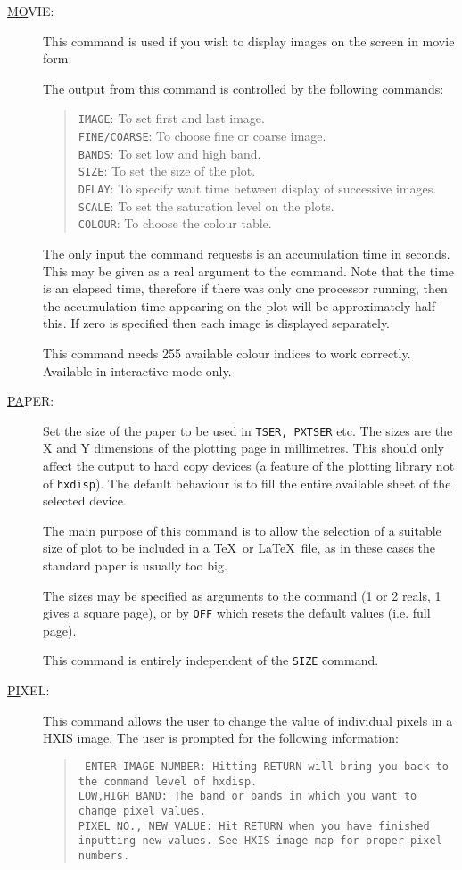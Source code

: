 \begin{description}
\item[\underline{MO}VIE: ] \label{mo}
This command is used if you wish to display images on the screen in
movie form.

The output from this command is controlled by the following commands:
\begin{quote}
{\tt IMAGE}: To set first and last image.\\ {\tt FINE/COARSE}: To
choose fine or coarse image.\\ {\tt BANDS}: To set low and high band.\\
{\tt SIZE}: To set the size of the plot.\\ {\tt DELAY}: To specify wait
time between display of successive images.\\ {\tt SCALE}: To set the
saturation level on the plots.\\ {\tt COLOUR}: To choose the colour
table.
\end{quote}

The only input the command requests is an accumulation time in seconds.
This may be given as a real argument to the command.  Note that the
time is an elapsed time, therefore if there was only one processor
running, then the accumulation time appearing on the plot will be
approximately half this.  If zero is specified then each image is
displayed separately.

This command needs 255 available colour indices to work correctly.
Available in interactive mode only.

\item[\underline{PA}PER: ] \label{pa}
Set the size of the paper to be used in {\tt TSER, PXTSER} etc.  The
sizes are the X and Y dimensions of the plotting page in millimetres.
This should only affect the output to hard copy devices (a feature of
the plotting library not of
\verb!hxdisp!). The default behaviour is to fill the entire available sheet of the
selected device.

The main purpose of this command is to allow the selection of a
suitable size of plot to be included in a \TeX\ or \LaTeX\ file, as in
these cases the standard paper is usually too big.

The sizes may be specified as arguments to the command (1 or 2 reals, 1
gives a square page), or by {\tt OFF} which resets the default values
(i.e. full page).

This command is entirely independent of the {\tt SIZE} command.

\item[\underline{PI}XEL: ] \label{pi}
This command allows the user to change the value of individual pixels
in a HXIS image. The user is prompted for the following information:
\begin{quote}\tt
ENTER IMAGE NUMBER: {\rm Hitting RETURN will bring you back to the
command level of \verb!hxdisp!.}\\ LOW,HIGH BAND: {\rm The band or
bands in which you want to change pixel values.}\\ PIXEL NO., NEW
VALUE: {\rm Hit RETURN when you have finished inputting new values. See
HXIS image map for proper pixel numbers.}
\end{quote}


\end{description}
